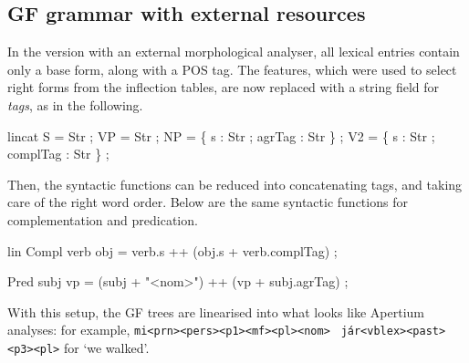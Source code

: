 \documentclass[10pt,a4paper]{article}
\newenvironment{Shaded}{\begin{snugshade}}{\end{snugshade}}
\newcommand{\DataTypeTok}[1]{\textcolor[rgb]{0.13,0.29,0.53}{{#1}}}
\newcommand{\StringTok}[1]{\textcolor[rgb]{0.31,0.60,0.02}{{#1}}}
\newcommand{\FunctionTok}[1]{\textcolor[rgb]{0.00,0.00,0.00}{{#1}}}
\newcommand{\NormalTok}[1]{{#1}}
\begin{document}
\subsection{GF grammar with external resources}

In the version with an external morphological analyser, all lexical
entries contain only a base form, along with a POS tag. The features,
which were used to select right forms from the inflection tables, are
now replaced with a string field for \emph{tags}, as in the following.

\begin{Shaded}
\begin{Highlighting}[]
  \NormalTok{lincat}
    \DataTypeTok{S}  \FunctionTok{=} \DataTypeTok{Str} \NormalTok{;}
    \DataTypeTok{VP} \FunctionTok{=} \DataTypeTok{Str} \NormalTok{;}
    \DataTypeTok{NP} \FunctionTok{=} \NormalTok{\{ s }\FunctionTok{:} \DataTypeTok{Str} \NormalTok{; agrTag }\FunctionTok{:} \DataTypeTok{Str} \NormalTok{\} ;}
    \DataTypeTok{V2} \FunctionTok{=} \NormalTok{\{ s }\FunctionTok{:} \DataTypeTok{Str} \NormalTok{; complTag }\FunctionTok{:} \DataTypeTok{Str} \NormalTok{\} ;}
\end{Highlighting}
\end{Shaded}

Then, the syntactic functions can be reduced into concatenating tags,
and taking care of the right word order. Below are the same syntactic
functions for complementation and predication.

\begin{Shaded}
\begin{Highlighting}[]
\NormalTok{lin }
  \DataTypeTok{Compl} \NormalTok{verb obj }\FunctionTok{=} \NormalTok{verb}\FunctionTok{.}\NormalTok{s }
                \FunctionTok{++} \NormalTok{(obj}\FunctionTok{.}\NormalTok{s }\FunctionTok{+} \NormalTok{verb}\FunctionTok{.}\NormalTok{complTag) ;}

  \DataTypeTok{Pred} \NormalTok{subj vp }\FunctionTok{=} \NormalTok{(subj }\FunctionTok{+} \StringTok{"<nom>"}\NormalTok{)}
              \FunctionTok{++} \NormalTok{(vp }\FunctionTok{+} \NormalTok{subj}\FunctionTok{.}\NormalTok{agrTag) ;}
\end{Highlighting}
\end{Shaded}

With this setup, the GF trees are linearised into what looks like
Apertium analyses: for example,
\texttt{mi<prn><pers><p1><mf><pl><nom>} \texttt{ j\'{a}r<vblex><past><p3><pl>} for `we walked'.
\end{document}

